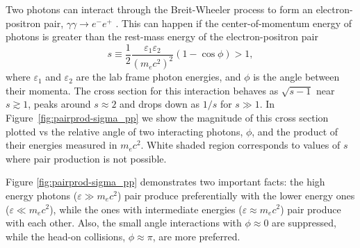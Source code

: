 Two photons can interact through the Breit-Wheeler process to form an electron-positron pair, $\gamma\gamma\to e^-e^+$ \citep{PhysRev.46.1087}. This can happen if the center-of-momentum energy of photons is greater than the rest-mass energy of the electron-positron pair
\begin{equation}
    \label{eq:pairprod-def_s}
    s \equiv \frac{1}{2}\frac{\varepsilon_1\varepsilon_2}{(m_e c^2)^2} (1-\cos{\phi}) > 1,
\end{equation}
where $\varepsilon_1$ and $\varepsilon_2$ are the lab frame photon energies, and $\phi$ is the angle between their momenta. The cross section for this interaction behaves as $\sqrt{s-1}$ near $s\gtrsim 1$, peaks around $s\approx 2$ and drops down as $1/s$ for $s\gg 1$. In Figure~\ref{fig:pairprod-sigma_pp} we show the magnitude of this cross section plotted vs the relative angle of two interacting photons, $\phi$, and the product of their energies measured in $m_ec^2$. White shaded region corresponds to values of $s$ where pair production is not possible.

Figure \ref{fig:pairprod-sigma_pp} demonstrates two important facts: the high energy photons ($\varepsilon \gg m_e c^2$) pair produce preferentially with the lower energy ones ($\varepsilon \ll m_e c^2$), while the ones with intermediate energies ($\varepsilon \approx m_e c^2$) pair produce with each other. Also, the small angle interactions with $\phi\approx 0$ are suppressed, while the head-on collisions, $\phi\approx \pi$, are more preferred.

\begin{figure}[htb]
\end{figure}

